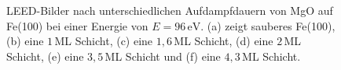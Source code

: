 \begin{figure}[H]
  \centering
  \qquad
  \qquad
  \qquad
  \qquad
  \qquad
  \caption{LEED-Bilder nach unterschiedlichen Aufdampfdauern von MgO auf Fe(100) bei einer Energie von $E=96\,\si{\eV}$. (a) zeigt sauberes Fe(100),
          (b) eine $1$\,ML Schicht, (c) eine $1,6$\,ML Schicht, (d) eine $2$\,ML Schicht, (e) eine $3,5$\,ML Schicht und (f) eine $4,3$\,ML Schicht.}%
  \label{fig:LEED}
\end{figure}


